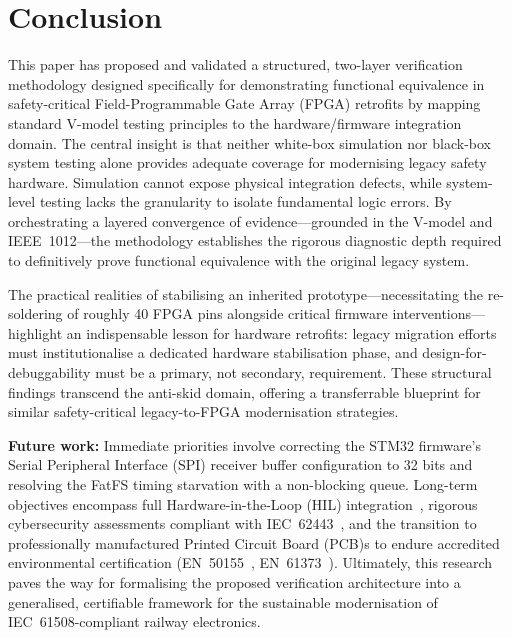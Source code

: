 \documentclass[journal, a4paper]{IEEEtran}
\newif\iffirstFPGA  \firstFPGAtrue
\newcommand{\FPGA}{\iffirstFPGA Field-Programmable Gate Array (FPGA)\global\firstFPGAfalse\else FPGA\fi}
\newif\iffirstSPI   \firstSPItrue
\newcommand{\SPI}{\iffirstSPI Serial Peripheral Interface (SPI)\global\firstSPIfalse\else SPI\fi}
\newif\iffirstHIL   \firstHILtrue
\newcommand{\HIL}{\iffirstHIL Hardware-in-the-Loop (HIL)\global\firstHILfalse\else HIL\fi}
\newif\iffirstPCB   \firstPCBtrue
\newcommand{\PCB}{\iffirstPCB Printed Circuit Board (PCB)\global\firstPCBfalse\else PCB\fi}
\begin{document}
\section{Conclusion}
\label{sec:conclusion}

This paper has proposed and validated a structured, two-layer verification methodology designed specifically for demonstrating functional equivalence in safety-critical \FPGA{} retrofits by mapping standard V-model testing principles to the hardware/firmware integration domain. The central insight is that neither white-box simulation nor black-box system testing alone provides adequate coverage for modernising legacy safety hardware. Simulation cannot expose physical integration defects, while system-level testing lacks the granularity to isolate fundamental logic errors. By orchestrating a layered convergence of evidence---grounded in the V-model and IEEE~1012---the methodology establishes the rigorous diagnostic depth required to definitively prove functional equivalence with the original legacy system.

The practical realities of stabilising an inherited prototype---necessitating the re-soldering of roughly 40 \FPGA{} pins alongside critical firmware interventions---highlight an indispensable lesson for hardware retrofits: legacy migration efforts must institutionalise a dedicated hardware stabilisation phase, and design-for-debuggability must be a primary, not secondary, requirement. These structural findings transcend the anti-skid domain, offering a transferrable blueprint for similar safety-critical legacy-to-\FPGA{} modernisation strategies.

\textbf{Future work:} Immediate priorities involve correcting the STM32 firmware's \SPI{} receiver buffer configuration to 32 bits and resolving the FatFS timing starvation with a non-blocking queue. Long-term objectives encompass full \HIL{} integration~\cite{hil_rail_suspension_2023,zhou_wu_2020}, rigorous cybersecurity assessments compliant with IEC~62443~\cite{iec62443_2013}, and the transition to professionally manufactured \PCB{}s to endure accredited environmental certification (EN~50155~\cite{en50155_2021}, EN~61373~\cite{en61373_2010}). Ultimately, this research paves the way for formalising the proposed verification architecture into a generalised, certifiable framework for the sustainable modernisation of IEC~61508-compliant railway electronics.
\end{document}
